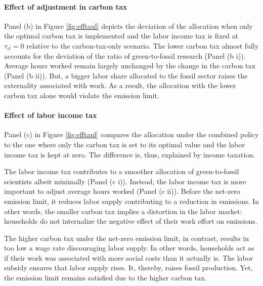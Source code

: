 \paragraph{Effect of adjustment in carbon tax}
Panel (b) in Figure \ref{fig:efftaul} depicts the deviation of the allocation when only the optimal carbon tax is implemented and the labor income tax is fixed at $\tau_{\iota t}=0$ relative to the carbon-tax-only scenario. The lower carbon tax almost fully accounts for the deviation of the ratio of green-to-fossil research (Panel (b i)). Average hours worked remain largely unchanged by the change in the carbon tax (Panel (b ii)). But, a bigger labor share allocated to the fossil sector raises the externality associated with work. As a result, the allocation with the lower carbon tax alone would violate the emission limit. 


\paragraph{Effect of labor income tax}

Panel (c) in Figure \ref{fig:efftaul} compares the allocation under the combined policy to the one where only the carbon tax is set to its optimal value and the labor income tax is kept at zero. The difference is, thus, explained by income taxation. 

The labor income tax contributes to a smoother allocation of green-to-fossil scientists albeit minimally (Panel (c i)). 
Instead, the labor income tax is more important to adjust average hours worked (Panel (c ii)). Before the net-zero emission limit, it reduces labor supply contributing to a reduction in emissions. In other words, the smaller carbon tax implies a distortion in the labor market: households do not internalize the negative effect of their work effort on emissions. 

The higher carbon tax under the net-zero emission limit, in contrast, results in too low a wage rate discouraging labor supply. In other words, households act as if their work was associated with more social costs than it actually is. The labor subsidy ensures that labor supply rises. It, thereby, raises fossil production. Yet, the emission limit remains satisfied due to the higher carbon tax. %

